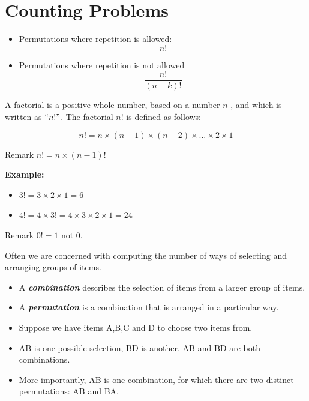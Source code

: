 \documentclass[12pt]{report}
\begin{document}
		\section{Counting Problems}
		\large
		\begin{itemize}
			\item Permutations where repetition is allowed: 
			\[ n! \]
			\item Permutations where repetition is not allowed
			\[ \frac{n!}{(n-k)!} \]
		\end{itemize}
		
		
		

A factorial is a positive whole number, based on a number $n$ , and which is written as $``n!"$. The factorial $n!$ is defined as follows:

\[n!  =n \times (n-1) \times (n-2) \times \ldots \times 2 \times 1 \]

Remark $n!  =n \times (n-1)!$\\ \bigskip

\textbf{ Example: }

\begin{itemize}
	\item $3!  = 3 \times 2  \times 1 = 6 $
	
	\item $4!  = 4 \times 3! = 4 \times 3 \times 2 \times 1 = 24$
\end{itemize}
Remark $0! = 1$ not $0$.



{\Large
	
	
	Often we are concerned with computing the number of ways of selecting and arranging groups of items. \begin{itemize} \item  A \textbf{\emph{combination}} describes the selection of items from a larger group of items.  \item A \textbf{\emph{permutation}} is a combination that is arranged in a particular way.
	\end{itemize}
	
	\bigskip
	\begin{itemize}
		\item Suppose we have items A,B,C and D to choose two items from.
		\item AB is one possible selection, BD is another. AB and BD are both combinations.
		\item More importantly, AB is one combination, for which there are two distinct permutations: AB and BA.
	\end{itemize}
}
\end{document}
